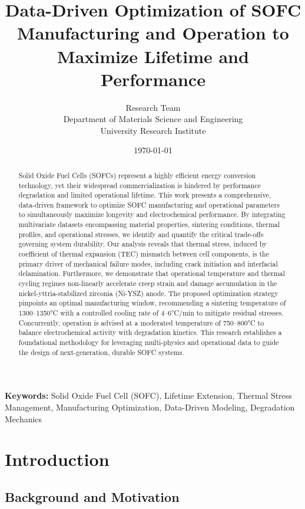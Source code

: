 \documentclass[11pt,a4paper]{article}
\title{Data-Driven Optimization of SOFC Manufacturing and Operation to Maximize Lifetime and Performance}
\author{Research Team\\
Department of Materials Science and Engineering\\
University Research Institute}
\date{\today}
\begin{document}
\maketitle

\begin{abstract}
Solid Oxide Fuel Cells (SOFCs) represent a highly efficient energy conversion technology, yet their widespread commercialization is hindered by performance degradation and limited operational lifetime. This work presents a comprehensive, data-driven framework to optimize SOFC manufacturing and operational parameters to simultaneously maximize longevity and electrochemical performance. By integrating multivariate datasets encompassing material properties, sintering conditions, thermal profiles, and operational stresses, we identify and quantify the critical trade-offs governing system durability. Our analysis reveals that thermal stress, induced by coefficient of thermal expansion (TEC) mismatch between cell components, is the primary driver of mechanical failure modes, including crack initiation and interfacial delamination. Furthermore, we demonstrate that operational temperature and thermal cycling regimes non-linearly accelerate creep strain and damage accumulation in the nickel-yttria-stabilized zirconia (Ni-YSZ) anode. The proposed optimization strategy pinpoints an optimal manufacturing window, recommending a sintering temperature of 1300–1350°C with a controlled cooling rate of 4–6°C/min to mitigate residual stresses. Concurrently, operation is advised at a moderated temperature of 750–800°C to balance electrochemical activity with degradation kinetics. This research establishes a foundational methodology for leveraging multi-physics and operational data to guide the design of next-generation, durable SOFC systems.
\end{abstract}

\textbf{Keywords:} Solid Oxide Fuel Cell (SOFC), Lifetime Extension, Thermal Stress Management, Manufacturing Optimization, Data-Driven Modeling, Degradation Mechanics

\section{Introduction}

\subsection{Background and Motivation}
\end{document}
